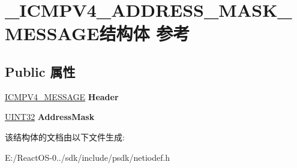 \hypertarget{struct___i_c_m_p_v4___a_d_d_r_e_s_s___m_a_s_k___m_e_s_s_a_g_e}{}\section{\+\_\+\+I\+C\+M\+P\+V4\+\_\+\+A\+D\+D\+R\+E\+S\+S\+\_\+\+M\+A\+S\+K\+\_\+\+M\+E\+S\+S\+A\+G\+E结构体 参考}
\label{struct___i_c_m_p_v4___a_d_d_r_e_s_s___m_a_s_k___m_e_s_s_a_g_e}
\subsection*{Public 属性}
\begin{DoxyCompactItemize}
\item 
\mbox{\label{struct___i_c_m_p_v4___a_d_d_r_e_s_s___m_a_s_k___m_e_s_s_a_g_e_aca9a7c7b775943affc0034b522b755b0}} 
\hyperlink{struct___i_c_m_p___m_e_s_s_a_g_e}{I\+C\+M\+P\+V4\+\_\+\+M\+E\+S\+S\+A\+GE} {\bfseries Header}
\item 
\mbox{\label{struct___i_c_m_p_v4___a_d_d_r_e_s_s___m_a_s_k___m_e_s_s_a_g_e_a69ef2554b071f528ba1f8d3043888618}} 
\hyperlink{_processor_bind_8h_ae1e6edbbc26d6fbc71a90190d0266018}{U\+I\+N\+T32} {\bfseries Address\+Mask}
\end{DoxyCompactItemize}


该结构体的文档由以下文件生成\+:\begin{DoxyCompactItemize}
\item 
E\+:/\+React\+O\+S-\/0../sdk/include/psdk/netiodef.\+h\end{DoxyCompactItemize}
